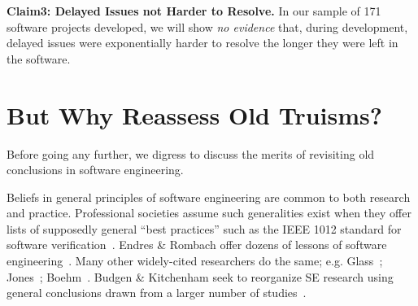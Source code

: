 \documentclass{sig-alternate}
\begin{document}
{\bf Claim3: Delayed Issues not Harder to Resolve.}
 In our sample of 
 171 software  projects developed, we will show
{\em no evidence}  that, during development, delayed issues were exponentially harder to resolve the longer they were left
 in the software. 
 


 


  



\section{ But Why Reassess Old Truisms?}

Before going any further,  we digress to discuss the merits of revisiting
old conclusions in software engineering.


Beliefs in general
principles of software
engineering are common to both research and practice. Professional societies assume such generalities exist when they offer
 lists of supposedly general ``best practices'' such as
the IEEE 1012 standard for software verification~\cite{1012}. 
 Endres \& Rombach offer dozens of lessons of software engineering~\cite{endres03}.
 Many other 
widely-cited researchers  do the same; e.g.
Glass~\cite{glass02}; Jones~\cite{jones07}; Boehm~\cite{boehm00b}.
Budgen \& Kitchenham seek to reorganize SE research using
general
conclusions drawn from a larger number of studies~\cite{kitch04,budgen09}.
\end{document}
